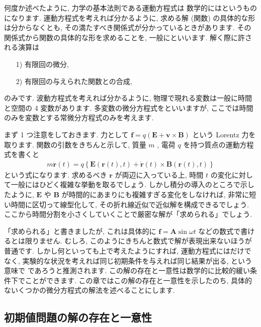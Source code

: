 \documentclass[openany, a4paper, oneside]{jsbook}
\begin{document}
何度か述べたように, 力学の基本法則である運動方程式は
数学的にはというものになります.
運動方程式を考えれば分かるように,
求める解 (関数) の具体的な形は分からなくとも, その満たすべき関係式が分かっているときがあります.
その関係式から関数の具体的な形を求めることを,
一般にといいます.
解く際に許される演算は
\begin{enumerate}
\item[1)] 有限回の微分,
\item[2)] 有限回の与えられた関数との合成,
\end{enumerate}
のみです.
波動方程式を考えれば分かるように, 物理で現れる変数は一般に時間と空間の 4 変数があります.
多変数の微分方程式をといいますが,
ここでは時間のみを変数とする常微分方程式のみを考えます.

まず 1 つ注意をしておきます.
力として $\bm{f} = q ( \bm{E} + \bm{v} \times \bm{B} )$ という Lorentz 力を取ります.
関数の引数をきちんと示して, 質量 $m$ , 電荷 $q$ を持つ質点の運動方程式を書くと
\begin{gather}
m \ddot{ \bm{r} } (t)
=
q \left \{ \bm{E} ( \bm{r} (t) , t ) + \dot{ \bm{r} } (t) \times \bm{B} ( \bm{r} (t) , t )  \right \}
\end{gather}
という式になります.
求めるべき $\bm{r}$ が両辺に入っている上, 時間 $t$ の変化に対して一般にはひどく複雑な挙動を取るでしょう.
しかし積分の導入のところで示したように,  $\bm{E}$ や $\bm{B}$ が時間的にあまりにも複雑すぎる変化をしなければ,
非常に短い時間に区切って線型化して, その折れ線近似で近似解を構成できるでしょう.
ここから時間分割を小さくしていくことで厳密な解が「求められる」でしょう.

「求められる」と書きましたが, これは具体的に $\bm{f} = \bm{A} \sin \omega t$ などの数式で書けるとは限りません.
むしろ, このようにきちんと数式で解が表現出来ないほうが普通です.
しかし何といっても上で考えたようにすれば, 運動方程式にはだけでなく,
実験的な状況を考えれば同じ初期条件を与えれば同じ結果が出る, という意味で
であろうと推測されます.
この解の存在と一意性は数学的に比較的緩い条件下でことができます.
この章ではこの解の存在と一意性を示したのち, 具体的ないくつかの微分方程式の解法を述べることにします.
\subsection{初期値問題の解の存在と一意性}
\end{document}
